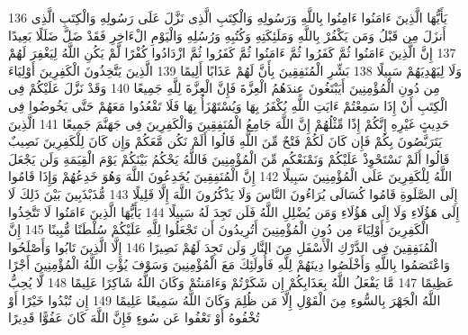 {\tiny\colorbox{cl_aya}{136}} يَأَيُّهَا الَّذِينَ ءَامَنُوا ءَامِنُوا بِاللَّهِ وَرَسُولِهِ وَالْكِتَبِ الَّذِى نَزَّلَ عَلَى رَسُولِهِ وَالْكِتَبِ الَّذِى أَنزَلَ مِن قَبْلُ وَمَن يَكْفُرْ بِاللَّهِ وَمَلَئِكَتِهِ وَكُتُبِهِ وَرُسُلِهِ وَالْيَوْمِ الْءَاخِرِ فَقَدْ ضَلَّ ضَلَلًا بَعِيدًا
{\tiny\colorbox{cl_aya}{137}} إِنَّ الَّذِينَ ءَامَنُوا ثُمَّ كَفَرُوا ثُمَّ ءَامَنُوا ثُمَّ كَفَرُوا ثُمَّ ازْدَادُوا كُفْرًا لَّمْ يَكُنِ اللَّهُ لِيَغْفِرَ لَهُمْ وَلَا لِيَهْدِيَهُمْ سَبِيلًا
{\tiny\colorbox{cl_aya}{138}} بَشِّرِ الْمُنَفِقِينَ بِأَنَّ لَهُمْ عَذَابًا أَلِيمًا
{\tiny\colorbox{cl_aya}{139}} الَّذِينَ يَتَّخِذُونَ الْكَفِرِينَ أَوْلِيَاءَ مِن دُونِ الْمُؤْمِنِينَ أَيَبْتَغُونَ عِندَهُمُ الْعِزَّةَ فَإِنَّ الْعِزَّةَ لِلَّهِ جَمِيعًا
{\tiny\colorbox{cl_aya}{140}} وَقَدْ نَزَّلَ عَلَيْكُمْ فِى الْكِتَبِ أَنْ إِذَا سَمِعْتُمْ ءَايَتِ اللَّهِ يُكْفَرُ بِهَا وَيُسْتَهْزَأُ بِهَا فَلَا تَقْعُدُوا مَعَهُمْ حَتَّى يَخُوضُوا فِى حَدِيثٍ غَيْرِهِ إِنَّكُمْ إِذًا مِّثْلُهُمْ إِنَّ اللَّهَ جَامِعُ الْمُنَفِقِينَ وَالْكَفِرِينَ فِى جَهَنَّمَ جَمِيعًا
{\tiny\colorbox{cl_aya}{141}} الَّذِينَ يَتَرَبَّصُونَ بِكُمْ فَإِن كَانَ لَكُمْ فَتْحٌ مِّنَ اللَّهِ قَالُوا أَلَمْ نَكُن مَّعَكُمْ وَإِن كَانَ لِلْكَفِرِينَ نَصِيبٌ قَالُوا أَلَمْ نَسْتَحْوِذْ عَلَيْكُمْ وَنَمْنَعْكُم مِّنَ الْمُؤْمِنِينَ فَاللَّهُ يَحْكُمُ بَيْنَكُمْ يَوْمَ الْقِيَمَةِ وَلَن يَجْعَلَ اللَّهُ لِلْكَفِرِينَ عَلَى الْمُؤْمِنِينَ سَبِيلًا
{\tiny\colorbox{cl_aya}{142}} إِنَّ الْمُنَفِقِينَ يُخَدِعُونَ اللَّهَ وَهُوَ خَدِعُهُمْ وَإِذَا قَامُوا إِلَى الصَّلَوةِ قَامُوا كُسَالَى يُرَاءُونَ النَّاسَ وَلَا يَذْكُرُونَ اللَّهَ إِلَّا قَلِيلًا
{\tiny\colorbox{cl_aya}{143}} مُّذَبْذَبِينَ بَيْنَ ذَلِكَ لَا إِلَى هَؤُلَاءِ وَلَا إِلَى هَؤُلَاءِ وَمَن يُضْلِلِ اللَّهُ فَلَن تَجِدَ لَهُ سَبِيلًا
{\tiny\colorbox{cl_aya}{144}} يَأَيُّهَا الَّذِينَ ءَامَنُوا لَا تَتَّخِذُوا الْكَفِرِينَ أَوْلِيَاءَ مِن دُونِ الْمُؤْمِنِينَ أَتُرِيدُونَ أَن تَجْعَلُوا لِلَّهِ عَلَيْكُمْ سُلْطَنًا مُّبِينًا
{\tiny\colorbox{cl_aya}{145}} إِنَّ الْمُنَفِقِينَ فِى الدَّرْكِ الْأَسْفَلِ مِنَ النَّارِ وَلَن تَجِدَ لَهُمْ نَصِيرًا
{\tiny\colorbox{cl_aya}{146}} إِلَّا الَّذِينَ تَابُوا وَأَصْلَحُوا وَاعْتَصَمُوا بِاللَّهِ وَأَخْلَصُوا دِينَهُمْ لِلَّهِ فَأُولَئِكَ مَعَ الْمُؤْمِنِينَ وَسَوْفَ يُؤْتِ اللَّهُ الْمُؤْمِنِينَ أَجْرًا عَظِيمًا
{\tiny\colorbox{cl_aya}{147}} مَّا يَفْعَلُ اللَّهُ بِعَذَابِكُمْ إِن شَكَرْتُمْ وَءَامَنتُمْ وَكَانَ اللَّهُ شَاكِرًا عَلِيمًا
{\tiny\colorbox{cl_aya}{148}} لَّا يُحِبُّ اللَّهُ الْجَهْرَ بِالسُّوءِ مِنَ الْقَوْلِ إِلَّا مَن ظُلِمَ وَكَانَ اللَّهُ سَمِيعًا عَلِيمًا
{\tiny\colorbox{cl_aya}{149}} إِن تُبْدُوا خَيْرًا أَوْ تُخْفُوهُ أَوْ تَعْفُوا عَن سُوءٍ فَإِنَّ اللَّهَ كَانَ عَفُوًّا قَدِيرًا
